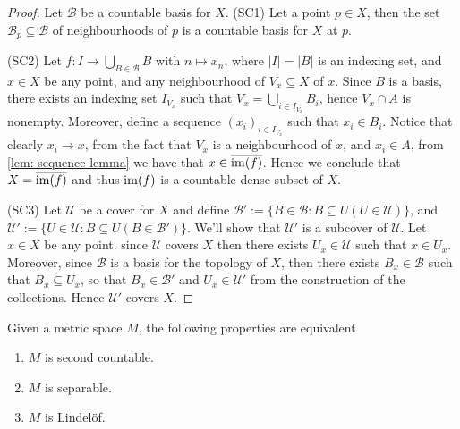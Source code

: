 \begin{proof}
  Let \(\mathcal B\) be a countable basis for \(X\).
  (SC1) Let a point \(p \in X\), then the set \(\mathcal B_p \subseteq \mathcal
  B\) of neighbourhoods of \(p\) is a countable basis for \(X\) at \(p\).

  (SC2) Let \(f: I \to \bigcup_{B \in \mathcal B} B\) with \(n \mapsto x_n\),
  where \(|I| = |B|\) is an indexing set, and \(x \in X\) be any point, and any
  neighbourhood of \(V_x \subseteq X\) of \(x\). Since \(B\) is a basis, there
  exists an indexing set \(I_{V_x}\) such that \(V_x = \bigcup_{i \in  I_{V_x}}
  B_i\), hence \(V_x \cap A\) is nonempty. Moreover, define a sequence
  \((x_i)_{i \in I_{V_x}}\) such that \(x_i \in B_i\). Notice that clearly \(x_i
  \to x\), from the fact that \(V_x\) is a neighbourhood of \(x\), and \(x_i \in
  A\), from \cref{lem: sequence lemma} we have that \(x \in \overline{\operatorname{im}(f)}\).
  Hence we conclude that \(X = \overline{\operatorname{im}(f)}\) and thus \(\operatorname{im}(f)\) is a
  countable dense subset of \(X\).

  (SC3) Let \(\mathcal U\) be a cover for \(X\) and define \(\mathcal B' := \{B
  \in \mathcal B : B \subseteq U (U \in \mathcal U)\}\), and \(\mathcal U' :=
  \{U \in \mathcal U : B \subseteq U (B \in \mathcal B')\}\). We'll show that
  \(\mathcal U'\) is a subcover of \(\mathcal U\). Let \(x \in X\) be any point.
  since \(\mathcal U\) covers \(X\) then there exists \(U_x \in \mathcal U\)
  such that \(x \in U_x\). Moreover, since \(\mathcal B\) is a basis for the
  topology of \(X\), then there exists \(B_x \in \mathcal B\) such that \(B_x
  \subseteq U_x\), so that \(B_x \in \mathcal B'\) and \(U_x \in \mathcal U'\)
  from the construction of the collections. Hence \(\mathcal U'\) covers \(X\).
\end{proof}

\begin{proposition}\label{prop: metric space properties}
  Given a metric space \(M\), the following properties are equivalent
  \begin{enumerate}[(MS1)]
    \item \(M\) is second countable.
    \item \(M\) is separable.
    \item \(M\) is Lindelöf.
  \end{enumerate}
\end{proposition}

